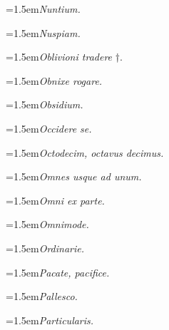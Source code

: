 \par{\dictfontsize\hangindent=1.5em\noindent \textit{Nuntium.} \par}
\par{\dictfontsize\hangindent=1.5em\noindent \textit{Nuspiam.} \par}
\par{\dictfontsize\hangindent=1.5em\noindent \textit{Oblivioni tradere} †. \par}
\par{\dictfontsize\hangindent=1.5em\noindent \textit{Obnixe rogare.} \par}
\par{\dictfontsize\hangindent=1.5em\noindent \textit{Obsidium.} \par}
\par{\dictfontsize\hangindent=1.5em\noindent \textit{Occidere se.} \par}
\par{\dictfontsize\hangindent=1.5em\noindent \textit{Octodecim, octavus decimus.} \par}
\par{\dictfontsize\hangindent=1.5em\noindent \textit{Omnes usque ad unum.} \par}
\par{\dictfontsize\hangindent=1.5em\noindent \textit{Omni ex parte.} \par}
\par{\dictfontsize\hangindent=1.5em\noindent \textit{Omnimode.} \par}
\par{\dictfontsize\hangindent=1.5em\noindent \textit{Ordinarie.} \par}
\par{\dictfontsize\hangindent=1.5em\noindent \textit{Pacate, pacifice.} \par}
\par{\dictfontsize\hangindent=1.5em\noindent \textit{Pallesco.} \par}
\par{\dictfontsize\hangindent=1.5em\noindent \textit{Particularis.} \par}

